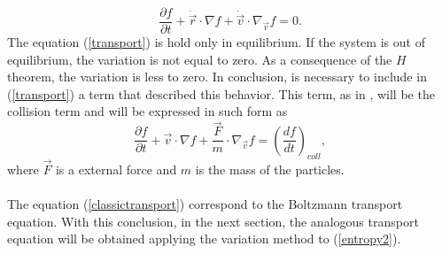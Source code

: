 \documentclass{article}
\begin{document}
\begin{equation}
    \frac{\partial f}{\partial t}+\dot{\vec{r}}\cdot \nabla f+\dot{\vec{v}}\cdot \nabla_{\vec{v}} f=0.\label{transport}
\end{equation}
The equation (\ref{transport}) is hold only in equilibrium. If the system is out of equilibrium, the variation is not equal to zero. As a consequence of the $H$ theorem, the variation is less to zero. In conclusion, is necessary to include in (\ref{transport}) a term that described this behavior. This term, as in \cite{huang}, will be the collision term and will be expressed in such form as
\begin{equation}
    \frac{\partial f}{\partial t}+\vec{v}\cdot \nabla f+\frac{\vec{F}}{m}\cdot \nabla_{\vec{v}} f=\left( \frac{df}{dt} \right)_{coll}, \label{classictransport}
\end{equation}
where $\vec{F}$ is a external force and $m$ is the mass of the particles.\\
\\
The equation (\ref{classictransport}) correspond to the Boltzmann transport equation. With this conclusion, in the next section, the analogous transport equation will be obtained applying the variation method to (\ref{entropy2}).
\end{document}
